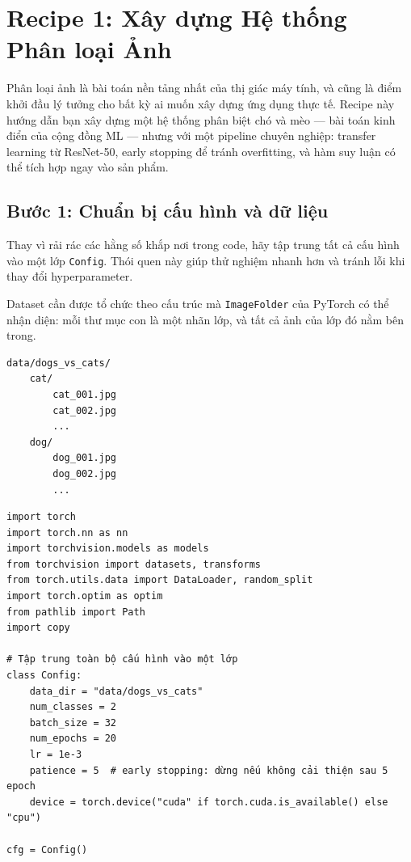 \section{Recipe 1: Xây dựng Hệ thống Phân loại Ảnh}
\label{sec:recipe_classification}

Phân loại ảnh là bài toán nền tảng nhất của thị giác máy tính, và cũng là điểm khởi đầu lý tưởng cho bất kỳ ai muốn xây dựng ứng dụng thực tế. Recipe này hướng dẫn bạn xây dựng một hệ thống phân biệt chó và mèo --- bài toán kinh điển của cộng đồng ML --- nhưng với một pipeline chuyên nghiệp: transfer learning từ ResNet-50, early stopping để tránh overfitting, và hàm suy luận có thể tích hợp ngay vào sản phẩm.

\subsection{Bước 1: Chuẩn bị cấu hình và dữ liệu}
\label{subsec:cls_data_prep}

Thay vì rải rác các hằng số khắp nơi trong code, hãy tập trung tất cả cấu hình vào một lớp \texttt{Config}. Thói quen này giúp thử nghiệm nhanh hơn và tránh lỗi khi thay đổi hyperparameter.

Dataset cần được tổ chức theo cấu trúc mà \texttt{ImageFolder} của PyTorch có thể nhận diện: mỗi thư mục con là một nhãn lớp, và tất cả ảnh của lớp đó nằm bên trong.

\begin{verbatim}
data/dogs_vs_cats/
    cat/
        cat_001.jpg
        cat_002.jpg
        ...
    dog/
        dog_001.jpg
        dog_002.jpg
        ...
\end{verbatim}

\begin{verbatim}
import torch
import torch.nn as nn
import torchvision.models as models
from torchvision import datasets, transforms
from torch.utils.data import DataLoader, random_split
import torch.optim as optim
from pathlib import Path
import copy

# Tập trung toàn bộ cấu hình vào một lớp
class Config:
    data_dir = "data/dogs_vs_cats"
    num_classes = 2
    batch_size = 32
    num_epochs = 20
    lr = 1e-3
    patience = 5  # early stopping: dừng nếu không cải thiện sau 5 epoch
    device = torch.device("cuda" if torch.cuda.is_available() else "cpu")

cfg = Config()
\end{verbatim}

